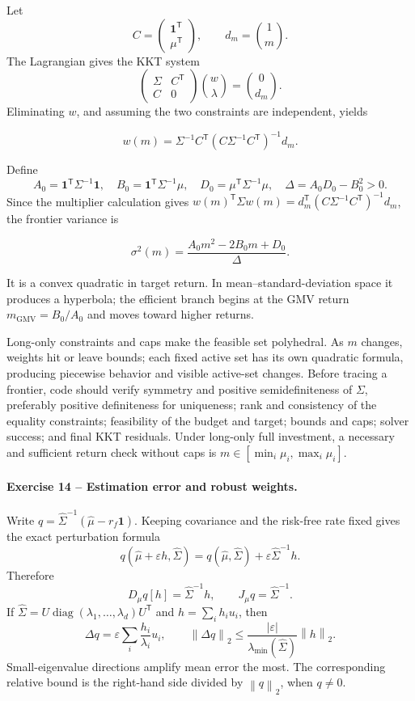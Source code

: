 \documentclass[10pt]{article}
\newcommand{\trans}{^{\mathsf T}}
\newcommand{\norm}[1]{\left\lVert#1\right\rVert}
\newcommand{\diag}{\operatorname{diag}}
\begin{document}
Let
\[
C=\begin{pmatrix}\mathbf1\trans\\\mu\trans\end{pmatrix},
\qquad d_m=\binom1m.
\]
The Lagrangian gives the KKT system
\[
\begin{pmatrix}\Sigma&C\trans\\C&0\end{pmatrix}
\binom{w}{\lambda}=\binom0{d_m}.
\]
Eliminating \(w\), and assuming the two constraints are independent, yields
\begin{resultbox}
\[
w(m)=\Sigma^{-1}C\trans
(C\Sigma^{-1}C\trans)^{-1}d_m.
\]
\end{resultbox}
Define
\[
A_0=\mathbf1\trans\Sigma^{-1}\mathbf1,
\quad B_0=\mathbf1\trans\Sigma^{-1}\mu,
\quad D_0=\mu\trans\Sigma^{-1}\mu,
\quad \Delta=A_0D_0-B_0^2>0.
\]
Since the multiplier calculation gives
\(w(m)\trans\Sigma w(m)=d_m\trans
(C\Sigma^{-1}C\trans)^{-1}d_m\), the frontier variance is
\begin{resultbox}
\[
\sigma^2(m)=\frac{A_0m^2-2B_0m+D_0}{\Delta}.
\]
\end{resultbox}
It is a convex quadratic in target return. In mean--standard-deviation space
it produces a hyperbola; the efficient branch begins at the GMV return
\(m_{\mathrm{GMV}}=B_0/A_0\) and moves toward higher returns.

Long-only constraints and caps make the feasible set polyhedral. As \(m\)
changes, weights hit or leave bounds; each fixed active set has its own
quadratic formula, producing piecewise behavior and visible active-set
changes. Before tracing a frontier, code should verify symmetry and positive
semidefiniteness of \(\Sigma\), preferably positive definiteness for
uniqueness; rank and consistency of the equality constraints; feasibility of
the budget and target; bounds and caps; solver success; and final KKT
residuals. Under long-only full investment, a necessary and sufficient return
check without caps is \(m\in[\min_i\mu_i,\max_i\mu_i]\).

\paragraph{Exercise 14 -- Estimation error and robust weights.}

Write
\(q=\widehat\Sigma^{-1}(\widehat\mu-r_f\mathbf1)\). Keeping covariance and
the risk-free rate fixed gives the exact perturbation formula
\[
q(\widehat\mu+\varepsilon h,\widehat\Sigma)
=q(\widehat\mu,\widehat\Sigma)
+\varepsilon\widehat\Sigma^{-1}h.
\]
Therefore
\[
D_\mu q[h]=\widehat\Sigma^{-1}h,
\qquad J_\mu q=\widehat\Sigma^{-1}.
\]
If
\(\widehat\Sigma=U\diag(\lambda_1,\ldots,\lambda_d)U\trans\) and
\(h=\sum_i h_i u_i\), then
\[
\Delta q=\varepsilon\sum_i\frac{h_i}{\lambda_i}u_i,
\qquad
\norm{\Delta q}_2
\leq\frac{|\varepsilon|}{\lambda_{\min}(\widehat\Sigma)}\norm h_2.
\]
Small-eigenvalue directions amplify mean error the most. The corresponding
relative bound is the right-hand side divided by
\(\norm q_2\), when \(q\ne0\).
\end{document}
